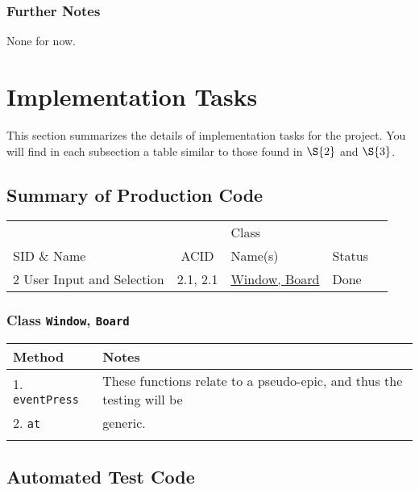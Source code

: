 \documentclass[11pt]{article}
\begin{document}
\subsubsection*{Further Notes}
\label{sec:org279f7a4}
None for now.

\section{Implementation Tasks}
\label{sec:org4e0d5fc}
This section summarizes the details of implementation tasks for the project. You will find in each
subsection a table similar to those found in \hyperref[sec:orgab45011]{\(\S{2}\)} and \hyperref[sec:org673c50b]{\(\S{3}\)}.

\subsection{Summary of Production Code}
\label{sec:orgb841cf0}

\begin{center}
\begin{tabular}{|p{4.5cm}|c|p{3.5cm}|p{4.5cm}|c|}
 &  & Class & \\
SID \& Name & ACID & Name(s) & Status\\
\hline
2 User Input and Selection & 2.1, 2.1 & \hyperref[sec:org27da33b]{Window, Board} & Done\\
\end{tabular}
\end{center}

\subsubsection{Class \texttt{Window}, \texttt{Board}}
\label{sec:org27da33b}
\begin{center}
\begin{tabular}{|l|l|}
Method & Notes\\
\hline
1. \texttt{eventPress} & These functions relate to a pseudo-epic, and thus the testing will be\\
2. \texttt{at} & generic.\\
 & \\
\end{tabular}
\end{center}

\subsection{Automated Test Code}
\label{sec:orgdad4473}
\end{document}
